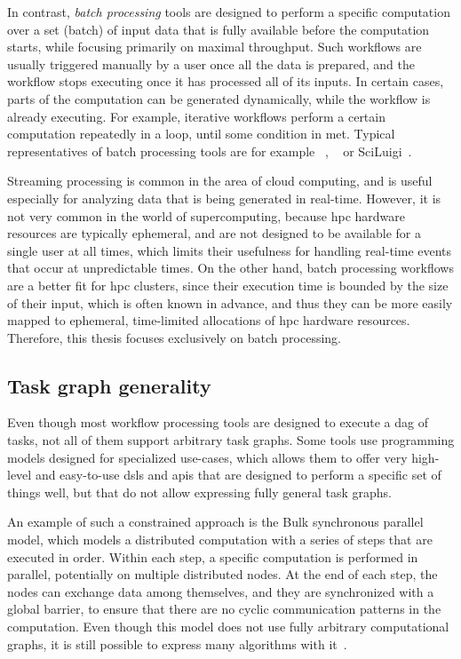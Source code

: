 In contrast, \emph{batch processing} tools are designed to perform a specific computation over a
set (batch) of input data that is fully available before the computation starts, while focusing
primarily on maximal throughput. Such workflows are usually triggered manually by a user once all
the data is prepared, and the workflow stops executing once it has processed all of its inputs. In
certain cases, parts of the computation can be generated dynamically, while the workflow is already
executing. For example, iterative workflows perform a certain computation repeatedly in a loop,
until some condition in met. Typical representatives of batch processing tools are for example
\dask{}~\cite{dask}, \snakemake{}~\cite{snakemake} or
SciLuigi~\cite{sciluigi}. %

Streaming processing is common in the area of cloud computing, and is useful especially for
analyzing data that is being generated in real-time. However, it is not very common in the world of
supercomputing, because \gls{hpc} hardware resources are typically ephemeral, and are
not designed to be available for a single user at all times, which limits their usefulness for
handling real-time events that occur at unpredictable times. On the other hand, batch processing
workflows are a better fit for \gls{hpc} clusters, since their execution time is
bounded by the size of their input, which is often known in advance, and thus they can be more
easily mapped to ephemeral, time-limited allocations of \gls{hpc} hardware resources.
Therefore, this thesis focuses exclusively on batch processing.

\subsection{Task graph generality}
Even though most workflow processing tools are designed to execute a \gls{dag} of
tasks, not all of them support arbitrary task graphs. Some tools use programming models designed
for specialized use-cases, which allows them to offer very high-level and easy-to-use
\glspl{dsl} and \glspl{api} that are designed to perform a specific set of
things well, but that do not allow expressing fully general task graphs.

An example of such a constrained approach is the Bulk synchronous parallel~\cite{bulkparallel1}
model, which models a distributed computation with a series of steps that are executed in order.
Within each step, a specific computation is performed in parallel, potentially on multiple
distributed nodes. At the end of each step, the nodes can exchange data among themselves, and they
are synchronized with a global barrier, to ensure that there are no cyclic communication patterns
in the computation. Even though this model does not use fully arbitrary computational graphs, it is
still possible to express many algorithms with it~\cite{bulkparallel2}.

